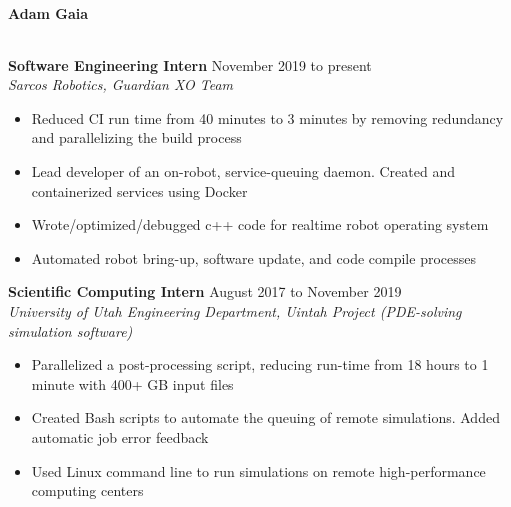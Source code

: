\documentclass{article}
\begin{document}
\begin{center}
{\huge\textbf{Adam Gaia}}
\end{center}

\begin{center}
\begin{tabular}{ c c c }

\end{tabular}
\end{center}




\noindent \textbf{Software Engineering Intern} \hfill  November 2019 to present \\
\textit{Sarcos Robotics, Guardian XO Team}
\begin{itemize}
    \item Reduced CI run time from 40 minutes to 3 minutes by removing redundancy and parallelizing the build process
    \item Lead developer of an on-robot, service-queuing daemon. Created and containerized services using Docker
    \item Wrote/optimized/debugged c++ code for realtime robot operating system
    \item Automated robot bring-up, software update, and code compile processes \\
\end{itemize}

\noindent \textbf{Scientific Computing Intern} \hfill  August 2017 to November 2019 \\
\textit{University of Utah Engineering Department, Uintah Project (PDE-solving simulation software)}
\begin{itemize}
    \item Parallelized a post-processing script, reducing run-time from 18 hours to 1 minute with 400+ GB input files
    \item Created Bash scripts to automate the queuing of remote simulations. Added automatic job error feedback
    \item Used Linux command line to run simulations on remote high-performance computing centers
\end{itemize}
\end{document}
